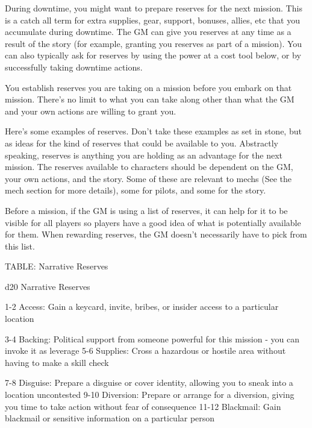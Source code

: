 During downtime, you might want to prepare reserves for the next mission. This is a catch all  
term for extra supplies, gear, support, bonuses, allies, etc that you accumulate during downtime.  
The GM can give you reserves at any time as a result of the story (for example, granting you  
reserves as part of a mission). You can also typically ask for reserves by using the power at a  
cost tool below, or by successfully taking downtime actions.
 

You establish reserves you are taking on a mission before you embark on that mission. There’s  
no limit to what you can take along other than what the GM and your own actions are willing to  
grant you.
 

Here’s some examples of reserves. Don’t take these examples as set in stone, but as ideas for  
the kind of reserves that could be available to you. Abstractly speaking, reserves is anything  
you are holding as an advantage for the next mission. The reserves available to characters  
should be dependent on the GM, your own actions, and the story. Some of these are relevant to  
mechs (See the mech section for more details), some for pilots, and some for the story.
 

Before a mission, if the GM is using a list of reserves, it can help for it to be visible for all  
players so players have a good idea of what is potentially available for them. When rewarding  
reserves, the GM doesn’t necessarily have to pick from this list.
 

TABLE: Narrative Reserves  

                                                                                                                 


 d20       Narrative	Reserves 

  1-2      Access: Gain a keycard, invite, bribes, or insider access to a particular location 

  3-4      Backing: Political support from someone powerful for this mission - you can invoke it  
           as leverage 
  5-6      Supplies: Cross a hazardous or hostile area without having to make a skill check 

  7-8      Disguise: Prepare a disguise or cover identity, allowing you to sneak into a location  
           uncontested 
 9-10      Diversion: Prepare or arrange for a diversion, giving you time to take action without  
           fear of consequence 
   11-12   Blackmail: Gain blackmail or sensitive information on a particular person 

